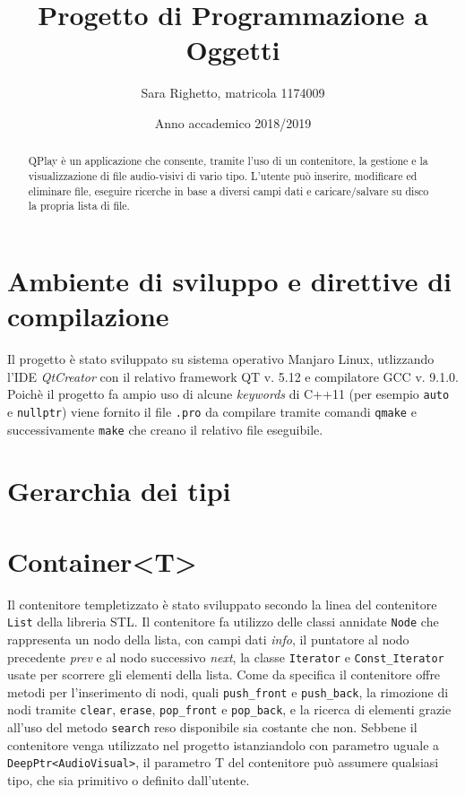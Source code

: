 

\title{Progetto di Programmazione a Oggetti}
\author{Sara Righetto, matricola 1174009}
\date{Anno accademico 2018/2019}


    \maketitle
    \begin{abstract}
        QPlay è un applicazione che consente, tramite l'uso di un contenitore, la gestione e la visualizzazione di file audio-visivi di vario tipo. L'utente può inserire, modificare ed eliminare file, eseguire ricerche in base a diversi campi dati e caricare/salvare su disco la propria lista di file.
    \end{abstract}

    \section*{Ambiente di sviluppo e direttive di compilazione}
        Il progetto è stato sviluppato su sistema operativo Manjaro Linux, utlizzando l'IDE \textit{QtCreator} con il relativo framework QT v. 5.12 e compilatore GCC v. 9.1.0. \newline
        Poichè il progetto fa ampio uso di alcune \textit{keywords} di C++11 (per esempio \texttt{auto} e \texttt{nullptr}) viene fornito il file \texttt{.pro} da compilare tramite comandi \texttt{qmake} e successivamente \texttt{make} che creano il relativo file eseguibile.

    \section*{Gerarchia dei tipi}
        

    \section*{Container<T>}
        Il contenitore templetizzato è stato sviluppato secondo la linea del contenitore \texttt{List} della libreria STL. \newline
        Il contenitore fa utilizzo delle classi annidate \texttt{Node} che rappresenta un nodo della lista, con campi dati \textit{info}, il puntatore al nodo precedente \textit{prev} e al nodo successivo \textit{next}, la classe \texttt{Iterator} e \texttt{Const\_Iterator} usate per scorrere gli elementi della lista. \newline
        Come da specifica il contenitore offre metodi per l'inserimento di nodi, quali \texttt{push\_front} e \texttt{push\_back}, la rimozione di nodi tramite \texttt{clear}, \texttt{erase}, \texttt{pop\_front} e \texttt{pop\_back}, e la ricerca di elementi grazie all'uso del metodo \texttt{search} reso disponibile sia costante che non. \newline
        Sebbene il contenitore venga utilizzato nel progetto istanziandolo con parametro uguale a \texttt{DeepPtr<AudioVisual>}, il parametro T del contenitore può assumere qualsiasi tipo, che sia primitivo o definito dall'utente.

